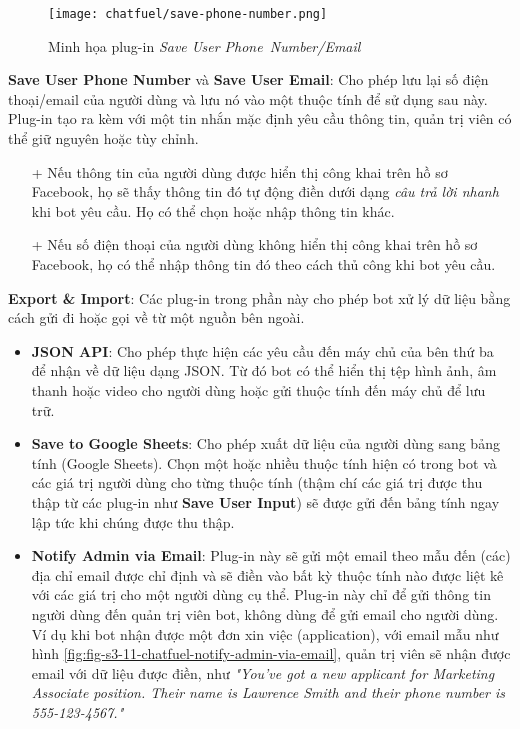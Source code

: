 \begin{itemize}
\begin{itemize}
		\begin{minipage}{\linewidth}
		\begin{wrapfigure}{r}{5cm}\centering
			\texttt{[image: chatfuel/save-phone-number.png]}
			\caption{Minh họa plug-in \textit{Save User Phone~Number/Email}}
			\label{fig:fig-s3-10-chatbot-ask-for-phone-number}
		\end{wrapfigure}
		\item \textbf{Save User Phone Number} và \textbf{Save User Email}: Cho phép lưu lại số điện thoại/email của người dùng và lưu nó vào một thuộc tính để sử dụng sau này. Plug-in tạo ra kèm với một tin nhắn mặc định yêu cầu thông tin, quản trị viên có thể giữ nguyên hoặc tùy chỉnh.\begin{itemize}
			\item[+] Nếu thông tin của người dùng được hiển thị công khai trên hồ sơ Facebook, họ sẽ thấy thông tin đó tự động điền dưới dạng \textit{câu trả lời nhanh} khi bot yêu cầu. Họ có thể chọn hoặc nhập thông tin khác.
			\item[+] Nếu số điện thoại của người dùng không hiển thị công khai trên hồ sơ Facebook, họ có thể nhập thông tin đó theo cách thủ công khi bot yêu cầu.
		\end{itemize}
		\end{minipage}
	\end{itemize}
	\item \textbf{Export \& Import}: Các plug-in trong phần này cho phép bot xử lý dữ liệu bằng cách gửi đi hoặc gọi về từ một nguồn bên ngoài. \begin{itemize}
		\item \textbf{JSON API}: Cho phép thực hiện các yêu cầu đến máy chủ của bên thứ ba để nhận về dữ liệu dạng JSON. Từ đó bot có thể hiển thị tệp hình ảnh, âm thanh hoặc video cho người dùng hoặc gửi thuộc tính đến máy chủ để lưu trữ.
		\item \textbf{Save to Google Sheets}: Cho phép xuất dữ liệu của người dùng sang bảng tính (Google Sheets). Chọn một hoặc nhiều thuộc tính hiện có trong bot và các giá trị người dùng cho từng thuộc tính (thậm chí các giá trị được thu thập từ các plug-in như \textbf{Save User Input}) sẽ được gửi đến bảng tính ngay lập tức khi chúng được thu thập.
		\item \textbf{Notify Admin via Email}: Plug-in này sẽ gửi một email theo mẫu đến (các) địa chỉ email được chỉ định và sẽ điền vào bất kỳ thuộc tính nào được liệt kê với các giá trị cho một người dùng cụ thể. Plug-in này chỉ để gửi thông tin người dùng đến quản trị viên bot, không dùng để gửi email cho người dùng. Ví dụ khi bot nhận được một đơn xin việc (application), với email mẫu như hình \ref{fig:fig-s3-11-chatfuel-notify-admin-via-email}, quản trị viên sẽ nhận được email với dữ liệu được điền, như \textit{"You've got a new applicant for Marketing Associate position. Their name is Lawrence Smith and their phone number is 555-123-4567."}\par

\end{itemize}
\end{itemize}
